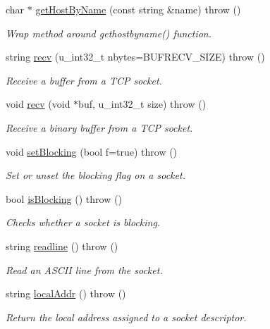 \begin{CompactItemize}
char $\ast$ \hyperlink{classSocket_c065c8091357f3d3b11d63f43bea734a}{getHostByName} (const string \&name)  throw ()
\begin{CompactList}\small\item\em Wrap method around gethostbyname() function. \item\end{CompactList}\item 
string \hyperlink{classSocket_58b58a3abc4914cfce721f7389327241}{recv} (u\_\-int32\_\-t nbytes=BUFRECV\_\-SIZE)  throw ()
\begin{CompactList}\small\item\em Receive a buffer from a TCP socket. \item\end{CompactList}\item 
void \hyperlink{classSocket_21a85ab2cc66b4e6f399c6b119f8263d}{recv} (void $\ast$buf, u\_\-int32\_\-t size)  throw ()
\begin{CompactList}\small\item\em Receive a binary buffer from a TCP socket. \item\end{CompactList}\item 
void \hyperlink{classSocket_cb7309a2f56ab9ed7769dccb39178200}{setBlocking} (bool f=true)  throw ()
\begin{CompactList}\small\item\em Set or unset the blocking flag on a socket. \item\end{CompactList}\item 
bool \hyperlink{classSocket_b09cfdaf17af3afd7c9cd7324aee9789}{isBlocking} ()  throw ()
\begin{CompactList}\small\item\em Checks whether a socket is blocking. \item\end{CompactList}\item 
string \hyperlink{classSocket_2e44502bb59aa3d338436e830c14fe27}{readline} ()  throw ()
\begin{CompactList}\small\item\em Read an ASCII line from the socket. \item\end{CompactList}\item 
string \hyperlink{classSocket_4d5155fc72ee36856c0d9ae9b0f24f7d}{localAddr} ()  throw ()
\begin{CompactList}\small\item\em Return the local address assigned to a socket descriptor. \item\end{CompactList}\item 

\end{CompactItemize}
